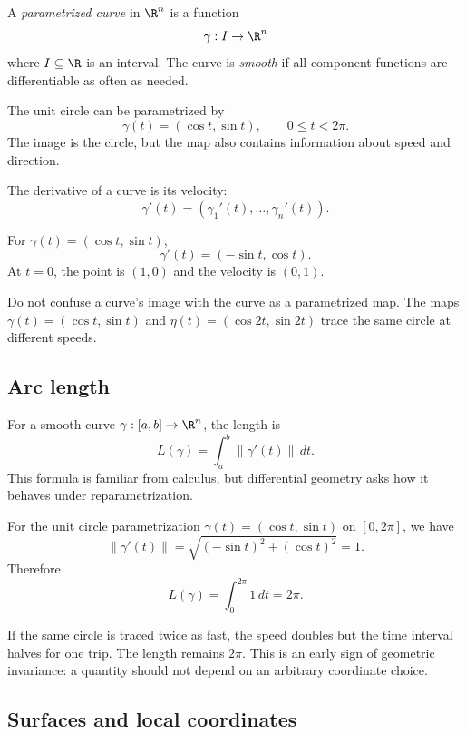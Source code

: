 \begin{definition}
A \emph{parametrized curve} in $\R^n$ is a function
\[
\gamma:I\to\R^n
\]
where $I\subseteq\R$ is an interval. The curve is \emph{smooth} if all component
functions are differentiable as often as needed.
\end{definition}

\begin{example}
The unit circle can be parametrized by
\[
\gamma(t)=(\cos t,\sin t),\qquad 0\leq t<2\pi.
\]
The image is the circle, but the map also contains information about speed and
direction.
\end{example}

The derivative of a curve is its velocity:
\[
\gamma'(t)=\left(\gamma_1'(t),\ldots,\gamma_n'(t)\right).
\]

\begin{example}
For $\gamma(t)=(\cos t,\sin t)$,
\[
\gamma'(t)=(-\sin t,\cos t).
\]
At $t=0$, the point is $(1,0)$ and the velocity is $(0,1)$.
\end{example}

\begin{trapbox}
Do not confuse a curve's image with the curve as a parametrized map. The maps
$\gamma(t)=(\cos t,\sin t)$ and $\eta(t)=(\cos 2t,\sin 2t)$ trace the same
circle at different speeds.
\end{trapbox}

\subsection{Arc length}

For a smooth curve $\gamma:[a,b]\to\R^n$, the length is
\[
L(\gamma)=\int_a^b \|\gamma'(t)\|\,dt.
\]
This formula is familiar from calculus, but differential geometry asks how it
behaves under reparametrization.

\begin{example}
For the unit circle parametrization $\gamma(t)=(\cos t,\sin t)$ on
$[0,2\pi]$, we have
\[
\|\gamma'(t)\|=\sqrt{(-\sin t)^2+(\cos t)^2}=1.
\]
Therefore
\[
L(\gamma)=\int_0^{2\pi}1\,dt=2\pi.
\]
\end{example}

If the same circle is traced twice as fast, the speed doubles but the time
interval halves for one trip. The length remains $2\pi$. This is an early sign
of geometric invariance: a quantity should not depend on an arbitrary coordinate
choice.

\subsection{Surfaces and local coordinates}

